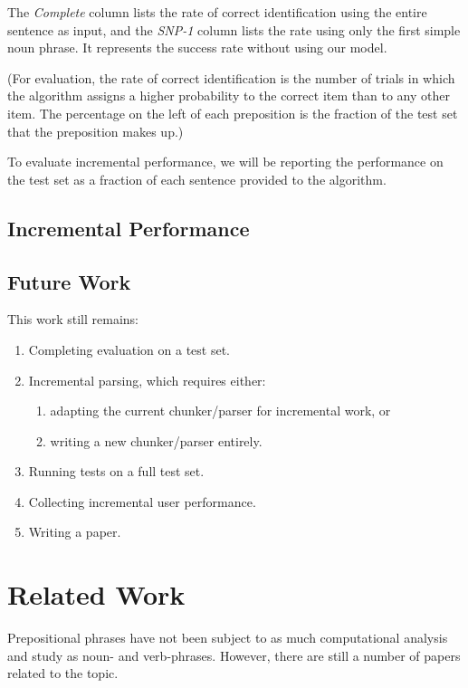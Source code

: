 \documentclass[letterpaper,10pt]{article}
\begin{document}
The \emph{Complete} column lists the rate of correct identification using the entire sentence as input, and the \emph{SNP-1} column lists the rate using only the first simple noun phrase. It represents the success rate without using our model.

(For evaluation, the rate of correct identification is the number of trials in which the algorithm assigns a higher probability to the correct item than to any other item. The percentage on the left of each preposition is the fraction of the test set that the preposition makes up.)

To evaluate incremental performance, we will be reporting the performance on the test set as a fraction of each sentence provided to the algorithm.

\subsection{Incremental Performance}



\subsection{Future Work}
This work still remains:
\begin{enumerate}[topsep=0pt,itemsep=-1ex,partopsep=1ex,parsep=1ex]
\item Completing evaluation on a test set.
\item Incremental parsing, which requires either:
\begin{enumerate}[topsep=0pt,itemsep=-1ex,partopsep=1ex,parsep=1ex]
\item adapting the current chunker/parser for incremental work, or
\item writing a new chunker/parser entirely.
\end{enumerate}
\item Running tests on a full test set.
\item Collecting incremental user performance.
\item Writing a paper.
\end{enumerate}


\section{Related Work}

Prepositional phrases have not been subject to as much computational analysis and study as noun- and verb-phrases. However, there are still a number of papers related to the topic. 
\end{document}
